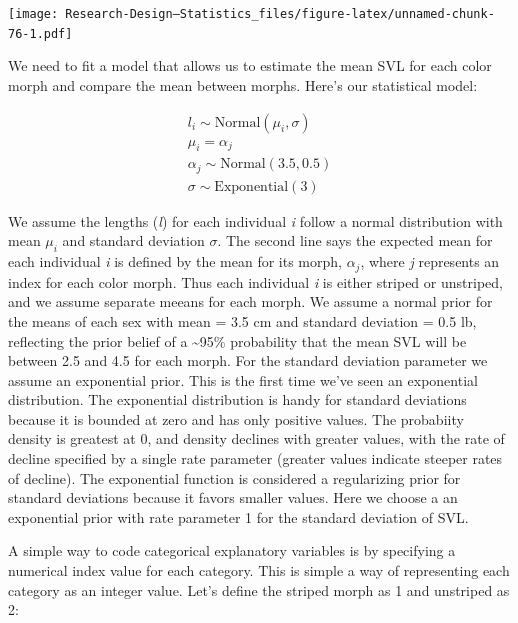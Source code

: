 \documentclass[
]{book}
\newenvironment{Shaded}{\begin{snugshade}}{\end{snugshade}}
\newcommand{\DecValTok}[1]{\textcolor[rgb]{0.00,0.00,0.81}{#1}}
\newcommand{\FunctionTok}[1]{\textcolor[rgb]{0.13,0.29,0.53}{\textbf{#1}}}
\newcommand{\NormalTok}[1]{#1}
\newcommand{\OtherTok}[1]{\textcolor[rgb]{0.56,0.35,0.01}{#1}}
\newcommand{\SpecialCharTok}[1]{\textcolor[rgb]{0.81,0.36,0.00}{\textbf{#1}}}
\newcommand{\StringTok}[1]{\textcolor[rgb]{0.31,0.60,0.02}{#1}}
\begin{document}
\texttt{[image: Research-Design---Statistics\_files/figure-latex/unnamed-chunk-76-1.pdf]}

We need to fit a model that allows us to estimate the mean SVL for each color morph and compare the mean between morphs. Here's our statistical model:

\[
\begin{array}{l}
l_i \sim \mathrm{Normal}(\mu_i, \sigma) \\
\mu_i = \alpha_{j} \\ 
\alpha_{j} \sim \mathrm{Normal}(3.5, 0.5) \\
\sigma \sim \mathrm{Exponential}(3)
\end{array}
\]

We assume the lengths (\emph{l}) for each individual \emph{i} follow a normal distribution with mean \(\mu_i\) and standard deviation \(\sigma\). The second line says the expected mean for each individual \emph{i} is defined by the mean for its morph, \(\alpha_j\), where \emph{j} represents an index for each color morph. Thus each individual \emph{i} is either striped or unstriped, and we assume separate meeans for each morph. We assume a normal prior for the means of each sex with mean = 3.5 cm and standard deviation = 0.5 lb, reflecting the prior belief of a \textasciitilde95\% probability that the mean SVL will be between 2.5 and 4.5 for each morph. For the standard deviation parameter we assume an exponential prior. This is the first time we've seen an exponential distribution. The exponential distribution is handy for standard deviations because it is bounded at zero and has only positive values. The probabiity density is greatest at 0, and density declines with greater values, with the rate of decline specified by a single rate parameter (greater values indicate steeper rates of decline). The exponential function is considered a regularizing prior for standard deviations because it favors smaller values. Here we choose a an exponential prior with rate parameter 1 for the standard deviation of SVL.

A simple way to code categorical explanatory variables is by specifying a numerical index value for each category. This is simple a way of representing each category as an integer value. Let's define the striped morph as 1 and unstriped as 2:

\begin{Shaded}
\end{Shaded}
\end{document}
